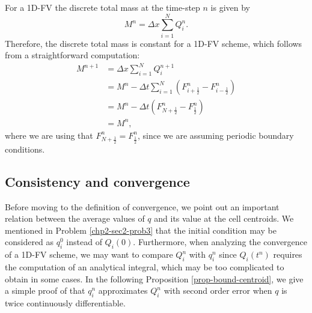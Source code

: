 For a 1D-FV the discrete total mass at the time-step $n$ is given by
\begin{equation*}
	M^n =  \Delta x \sum_{i=1}^N Q_i^n.
\end{equation*}
Therefore, the discrete total mass is constant for a 1D-FV scheme,
which follows from a straightforward computation:
\begin{align*}
	M^{n+1} &=  \Delta x \sum_{i=1}^N Q_i^{n+1} \\ 
					&= M^{n} - \Delta t  \sum_{i=1}^N (F^n_{i+\frac{1}{2}}- F^n_{i-\frac{1}{2}})\\
					&= M^{n} - \Delta t (F^n_{N+\frac{1}{2}}- F^n_{\frac{1}{2}})\\
					&= M^{n},
\end{align*}
where we are using that $F^n_{N+\frac{1}{2}} = F^n_{\frac{1}{2}}$, since we are assuming periodic boundary
conditions.

\subsection{Consistency and convergence}
\label{chp2-sub-CC}
Before moving to the definition of convergence, we point out an important relation
between the average values of $q$ and its value at the cell centroids.
We mentioned in Problem \ref{chp2-sec2-prob3} that the initial condition may be considered as $q_i^0$
instead of $Q_i(0)$. 
Furthermore, when analyzing the convergence of a 1D-FV scheme, we may 
want to compare $Q_i^n$ with $q_i^n$ since $Q_i(t^n)$ requires the computation of 
an analytical integral, which may be too complicated to obtain in some cases.
In the following Proposition \ref{prop-bound-centroid}, we give a simple proof
of that $q_i^n$ approximates $Q_i^n$ with second order error when $q$ is twice
continuously differentiable.

